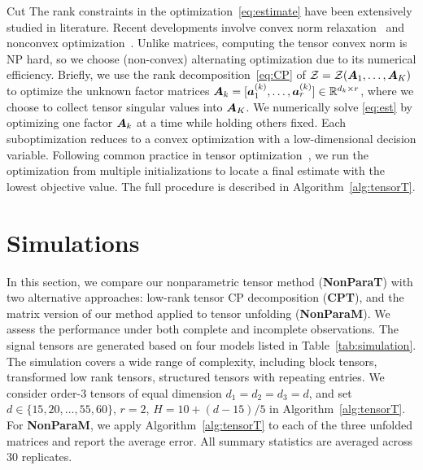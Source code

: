 \documentclass{article}
\theoremstyle{plain}
\theoremstyle{definition}
\begin{document}
\vspace{-.5cm}
{\color{red} Cut} The rank constraints in the optimization~\eqref{eq:estimate} have been extensively studied in literature. Recent developments involve convex norm relaxation~\citep{ghadermarzy2018learning} and nonconvex optimization~\citep{wang2018learning, han2020optimal}. Unlike matrices, computing the tensor convex norm is NP hard, so we choose (non-convex) alternating optimization due to its numerical efficiency. Briefly, we use the rank decomposition~\eqref{eq:CP} of $\mathcal{Z}=\mathcal{Z}(\bm A_1,\ldots, \bm A_K)$ to optimize the unknown factor matrices $\bm A_k=[\bm{a}^{(k)}_1,\ldots,\bm{a}^{(k)}_r]\in\mathbb{R}^{d_k\times r}$, where we choose to collect tensor singular values into $\bm A_K$. We numerically solve \eqref{eq:est} by optimizing one factor $\bm A_k$ at a time while holding others fixed. Each suboptimization reduces to a convex optimization with a low-dimensional decision variable. Following common practice in tensor optimization~\citep{anandkumar2014tensor,hong2020generalized}, we run the optimization from multiple initializations to locate a final estimate with the lowest objective value. The full procedure is described in Algorithm~\ref{alg:tensorT}.


\vspace{-.3cm}
\section{Simulations}\label{sec:simulation}
\vspace{-.2cm}
In this section, we compare our nonparametric tensor method ({\bf NonParaT}) with two alternative approaches: low-rank tensor CP decomposition ({\bf CPT}), and the matrix version of our method applied to tensor unfolding ({\bf NonParaM}). We assess the performance under both complete and incomplete observations. The signal tensors are generated based on four models listed in Table~\ref{tab:simulation}. The simulation covers a wide range of complexity, including block tensors, transformed low rank tensors, structured tensors with repeating entries. We consider order-3  tensors of equal dimension $d_1=d_2=d_3=d$, and set $d\in \{15, 20,\ldots,55,60\}$, $r=2$, $H=10+{(d-15)/ 5}$ in Algorithm~\ref{alg:tensorT}. For {\bf NonParaM}, we apply Algorithm~\ref{alg:tensorT} to each of the three unfolded matrices and report the average error. All summary statistics are averaged across $30$ replicates.  
\end{document}

